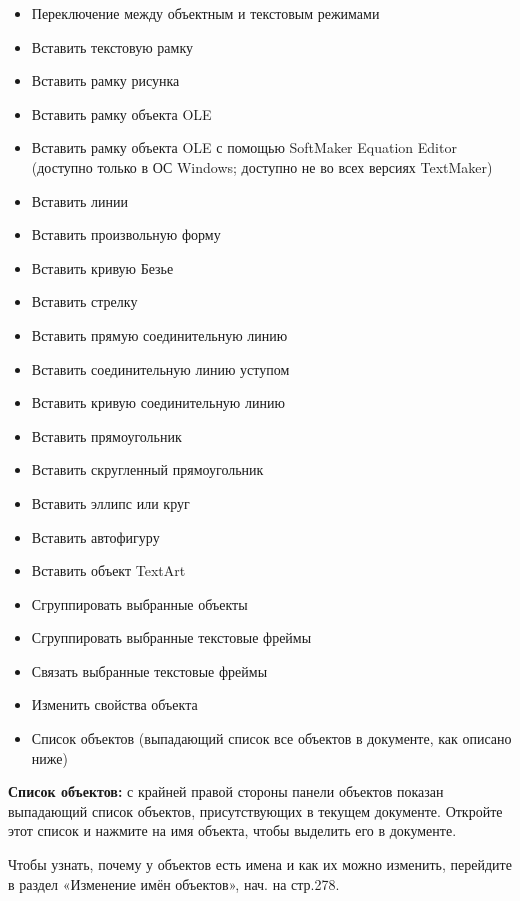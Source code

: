 ﻿\documentclass[a4paper,10pt]{article}
\begin{document}
\begin{itemize}
 \item Переключение между объектным и текстовым режимами
 \newline
 \item Вставить текстовую рамку
 \item Вставить рамку рисунка
 \item Вставить рамку объекта OLE
 \item Вставить рамку объекта OLE с помощью SoftMaker Equation Editor (доступно только в ОС Windows; доступно не во всех версиях TextMaker)
 \newline
 \item Вставить линии
 \item Вставить произвольную форму
 \item Вставить кривую Безье
 \item Вставить стрелку
 \item Вставить прямую соединительную линию
 \item Вставить соединительную линию уступом
 \item Вставить кривую соединительную линию
 \item Вставить прямоугольник
 \item Вставить скругленный прямоугольник
 \item Вставить эллипс или круг
 \item Вставить автофигуру
 \item Вставить объект TextArt
 \newline
 \item Сгруппировать выбранные объекты
 \newline
 \item Сгруппировать выбранные текстовые фреймы
 \newline
 \item Связать выбранные текстовые фреймы
 \newline
 \item Изменить свойства объекта
 \item Список объектов (выпадающий список все объектов в документе, как описано ниже)
\end{itemize}

\textbf{Список объектов:} с крайней правой стороны панели объектов показан выпадающий список объектов, присутствующих в текущем документе. Откройте этот список и нажмите на имя объекта, чтобы выделить его в документе.

Чтобы узнать, почему у объектов есть имена и как их можно изменить, перейдите в раздел «Изменение имён объектов», нач. на стр.278.
\end{document}
